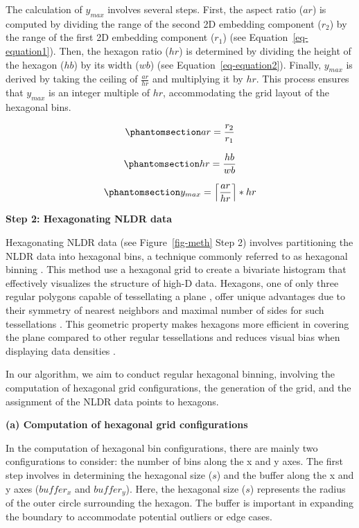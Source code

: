 \documentclass[
  12pt]{article}
\begin{document}
The calculation of \(y_{max}\) involves several steps. First, the aspect
ratio (\(ar\)) is computed by dividing the range of the second 2D
embedding component (\(r_2\)) by the range of the first 2D embedding
component (\(r_1\)) (see Equation~\ref{eq-equation1}). Then, the hexagon
ratio (\(hr\)) is determined by dividing the height of the hexagon
(\(hb\)) by its width (\(wb\)) (see Equation~\ref{eq-equation2}).
Finally, \(y_{max}\) is derived by taking the ceiling of
\(\frac{ar}{hr}\) and multiplying it by \(hr\). This process ensures
that \(y_{max}\) is an integer multiple of \(hr\), accommodating the
grid layout of the hexagonal bins.

\begin{equation}\phantomsection\label{eq-equation1}{
 ar = \frac{r_2}{r_1}
}\end{equation}

\begin{equation}\phantomsection\label{eq-equation2}{
 hr = \frac{hb}{wb}
}\end{equation}

\begin{equation}\phantomsection\label{eq-equation3}{
 y_{max} = \left\lceil\frac{ar}{hr}\right\rceil * hr
}\end{equation}

\textbf{Step 2: Hexagonating NLDR data}

Hexagonating NLDR data (see Figure~\ref{fig-meth} Step 2) involves
partitioning the NLDR data into hexagonal bins, a technique commonly
referred to as hexagonal binning \citep[\citet{article66}]{Carr1987}.
This method use a hexagonal grid to create a bivariate histogram that
effectively visualizes the structure of high-D data. Hexagons, one of
only three regular polygons capable of tessellating a plane
\citep{Carr2013}, offer unique advantages due to their symmetry of
nearest neighbors and maximal number of sides for such tessellations
\citep{Dan2023}. This geometric property makes hexagons more efficient
in covering the plane compared to other regular tessellations and
reduces visual bias when displaying data densities \citep{Dan2023}.

In our algorithm, we aim to conduct regular hexagonal binning, involving
the computation of hexagonal grid configurations, the generation of the
grid, and the assignment of the NLDR data points to hexagons.

\textbf{(a) Computation of hexagonal grid configurations}

In the computation of hexagonal bin configurations, there are mainly two
configurations to consider: the number of bins along the x and y axes.
The first step involves in determining the hexagonal size (\(s\)) and
the buffer along the x and y axes (\(buffer_{x}\) and \(buffer_{y}\)).
Here, the hexagonal size (\(s\)) represents the radius of the outer
circle surrounding the hexagon. The buffer is important in expanding the
boundary to accommodate potential outliers or edge cases.
\end{document}
